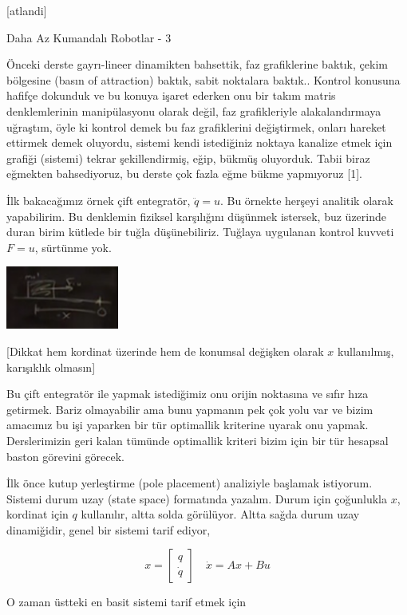 \documentclass[12pt,fleqn]{article}\usepackage{../../common}
\begin{document}
[atlandi]

Daha Az Kumandalı Robotlar - 3

Önceki derste gayrı-lineer dinamikten bahsettik, faz grafiklerine baktık,
çekim bölgesine (basın of attraction) baktık, sabit noktalara baktık..
Kontrol konusuna hafifçe dokunduk ve bu konuya işaret ederken onu bir takım
matris denklemlerinin manipülasyonu olarak değil, faz grafikleriyle
alakalandırmaya uğraştım, öyle ki kontrol demek bu faz grafiklerini
değiştirmek, onları hareket ettirmek demek oluyordu, sistemi kendi
istediğiniz noktaya kanalize etmek için grafiği (sistemi) tekrar
şekillendirmiş, eğip, bükmüş oluyorduk. Tabii biraz eğmekten bahsediyoruz,
bu derste çok fazla eğme bükme yapmıyoruz [1]. 

İlk bakacağımız örnek çift entegratör, $\ddot{q} = u$. Bu örnekte herşeyi
analitik olarak yapabilirim. Bu denklemin fiziksel karşılığını düşünmek
istersek, buz üzerinde duran birim kütlede bir tuğla düşünebiliriz. Tuğlaya
uygulanan kontrol kuvveti $F = u$, sürtünme yok. 

\includegraphics[width=10em]{phy_control_01.png}

[Dikkat hem kordinat üzerinde hem de konumsal değişken olarak $x$
kullanılmış, karışıklık olmasın] 

Bu çift entegratör ile yapmak istediğimiz onu orijin noktasına ve sıfır
hıza getirmek. Bariz olmayabilir ama bunu yapmanın pek çok yolu var ve
bizim amacımız bu işi yaparken bir tür optimallik kriterine uyarak onu
yapmak. Derslerimizin geri kalan tümünde optimallik kriteri bizim için bir
tür hesapsal baston görevini görecek.

İlk önce kutup yerleştirme (pole placement) analiziyle başlamak
istiyorum. Sistemi durum uzay (state space) formatında yazalım. Durum için
çoğunlukla $x$, kordinat için $q$ kullanılır, altta solda görülüyor. Altta
sağda durum uzay dinamiğidir, genel bir sistemi tarif ediyor,

$$ 
x = \left[\begin{array}{c} q \\ \dot{q}  \end{array}\right] \quad
\dot{x} = A x + Bu
$$

O zaman üstteki en basit sistemi tarif etmek için
\end{document}

